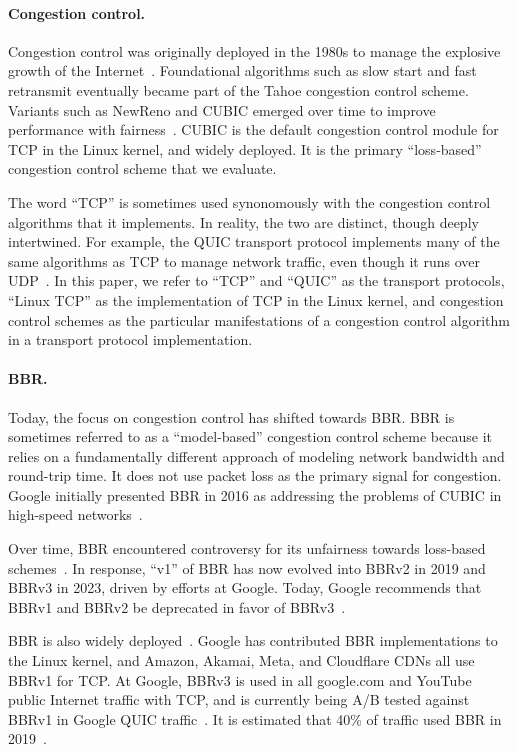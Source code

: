 \paragraph{Congestion control.}

Congestion control was originally deployed in the 1980s to manage the explosive
growth of the Internet~\cite{vjk}. Foundational algorithms such as slow start
and fast retransmit eventually became part of the Tahoe congestion control
scheme. Variants such as NewReno and CUBIC emerged over time to improve
performance with fairness~\cite{ha2008cubic}. CUBIC is the default congestion control module for
TCP in the Linux kernel, and widely deployed. It is the primary ``loss-based''
congestion control scheme that we evaluate.

The word ``TCP'' is sometimes used synonomously with the congestion control
algorithms that it implements. In reality, the two are distinct, though deeply
intertwined. For example, the QUIC transport protocol implements many of the
same algorithms as TCP to manage network traffic, even though it runs over UDP~\cite{rfc9000}.
In this paper, we refer to ``TCP'' and ``QUIC'' as the transport protocols,
``Linux TCP'' as the implementation of TCP in the Linux kernel, and congestion
control schemes as the particular manifestations of a congestion control
algorithm in a transport protocol implementation.

\paragraph{BBR.}

Today, the focus on congestion control has shifted towards BBR. BBR is sometimes
referred to as a ``model-based'' congestion control scheme because it relies on
a fundamentally different approach of modeling network bandwidth and round-trip
time. It does not use packet loss as the primary signal for congestion. Google
initially presented BBR in 2016 as addressing the problems of CUBIC in
high-speed networks~\cite{cardwell2016bbr-ietf97}.

Over time, BBR encountered controversy for its unfairness towards loss-based
schemes~\cite{ware2019modeling,philip2021revisiting,cao2019use}. In response,
``v1'' of BBR has now evolved into BBRv2 in 2019 and BBRv3 in 2023, driven by
efforts at Google. Today, Google recommends that BBRv1 and BBRv2 be
deprecated in favor of BBRv3~\cite{cardwell2024bbrv3-ietf119}.

BBR is also widely deployed~\cite
{cardwell2024bbrv3-ietf119-qna,ware2024ccanalyzer}. Google has contributed BBR
implementations to the Linux kernel, and Amazon, Akamai, Meta, and Cloudflare
CDNs all use BBRv1 for TCP. At Google, BBRv3 is used in all google.com and
YouTube public Internet traffic with TCP, and is currently being A/B tested
against BBRv1 in Google QUIC traffic~\cite{cardwell2024bbrv3-ietf119}.
It is estimated that 40\% of traffic used BBR in 2019~\cite{mishra2019great}.

